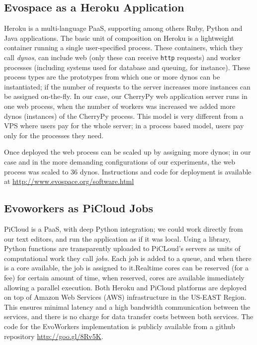 \documentclass{llncs}
\begin{document}
\subsection{Evospace as a Heroku Application}
Heroku is a multi-language PaaS, supporting among others
Ruby, Python and Java applications. The basic unit of composition on
Heroku is a lightweight container running a single user-specified
process. These containers, which they call {\em dynos}, can include web
(only these can receive {\tt http} requests) and worker processes
(including systems used for database and queuing, for instance).
These  process types are the prototypes from which one or more dynos can be instantiated;
if the number of requests to the server increases
more instances can be assigned on-the-fly. In our case, our CherryPy web application server
runs in one web process, when the number of workers was increased we added more dynos (instances) of the CherryPy process.
This model is very different from a VPS where users pay for the
whole server; in a process based model, users pay only for the
processes they need.

Once deployed the web process can be scaled up by assigning more dynos; in our case and in the more demanding configurations of our experiments, the web process was scaled to 36 dynos. Instructions and code for deployment is available at \url{http://www.evospace.org/software.html}
\subsection{Evoworkers as PiCloud Jobs}
PiCloud is a PaaS, with deep Python integration; we could work directly from our text editors, and run the application as if it was local. Using a library, Python functions are transparently uploaded to PiCLoud's servers as units of computational work they call \emph{jobs}. Each job is added to a queue, and when there is a core available, the job is assigned to it.Realtime cores can be reserved (for a fee) for certain amount of time, when reserved, cores are available immediately allowing a parallel execution. Both Heroku and PiCloud platforms are deployed  on top of Amazon Web Services (AWS) infrastructure in the US-EAST Region. This ensures minimal latency and a high bandwidth communication between the services, and there is no charge for data transfer costs between both services. The code for the EvoWorkers implementation is publicly available from a github repository \url{http://goo.gl/8Rv5K}.
\end{document}

